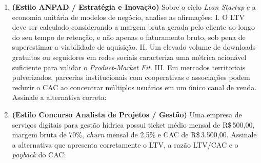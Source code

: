 \begin{enumerate}[leftmargin=1.5em, itemsep=6pt]
  \item \textbf{(Estilo ANPAD / Estratégia e Inovação)} Sobre o ciclo \textit{Lean Startup} e a economia unitária de modelos de negócio, analise as afirmações:
  I. O LTV deve ser calculado considerando a margem bruta gerada pelo cliente ao longo do seu tempo de retenção, e não apenas o faturamento bruto, sob pena de superestimar a viabilidade de aquisição.
  II. Um elevado volume de downloads gratuitos ou seguidores em redes sociais caracteriza uma métrica acionável suficiente para validar o \textit{Product-Market Fit}.
  III. Em mercados territoriais pulverizados, parcerias institucionais com cooperativas e associações podem reduzir o CAC ao concentrar múltiplos usuários em um único canal de venda.
  Assinale a alternativa correta:
  \espacoResolucao[1.5cm]

  \item \textbf{(Estilo Concurso Analista de Projetos / Gestão)} Uma empresa de serviços digitais para gestão hídrica possui ticket médio mensal de R\$\,500,00, margem bruta de 70\%, \textit{churn} mensal de 2{,}5\% e CAC de R\$\,3.500,00. Assinale a alternativa que apresenta corretamente o LTV, a razão LTV/CAC e o \textit{payback} do CAC:
  \espacoResolucao[1.6cm]


\end{enumerate}
